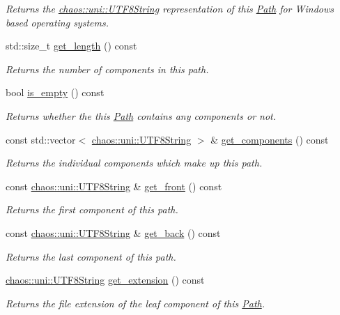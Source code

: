 \begin{DoxyCompactItemize}
\begin{DoxyCompactList}\small\item\em Returns the \hyperlink{classchaos_1_1uni_1_1_u_t_f8_string}{chaos\+::uni\+::\+U\+T\+F8\+String} representation of this \hyperlink{classchaos_1_1io_1_1sys_1_1_path}{Path} for Windows based operating systems. \end{DoxyCompactList}\item 
std\+::size\+\_\+t \hyperlink{classchaos_1_1io_1_1sys_1_1_path_aa3edecd81cd92a4fb16803bd9de9e7a4}{get\+\_\+length} () const 
\begin{DoxyCompactList}\small\item\em Returns the number of components in this path. \end{DoxyCompactList}\item 
bool \hyperlink{classchaos_1_1io_1_1sys_1_1_path_ad0eda5171d722eae64332dc143b6840b}{is\+\_\+empty} () const 
\begin{DoxyCompactList}\small\item\em Returns whether the this \hyperlink{classchaos_1_1io_1_1sys_1_1_path}{Path} contains any components or not. \end{DoxyCompactList}\item 
const std\+::vector$<$ \hyperlink{classchaos_1_1uni_1_1_u_t_f8_string}{chaos\+::uni\+::\+U\+T\+F8\+String} $>$ \& \hyperlink{classchaos_1_1io_1_1sys_1_1_path_ae20cae838af510b945e716d529e19bf4}{get\+\_\+components} () const 
\begin{DoxyCompactList}\small\item\em Returns the individual components which make up this path. \end{DoxyCompactList}\item 
const \hyperlink{classchaos_1_1uni_1_1_u_t_f8_string}{chaos\+::uni\+::\+U\+T\+F8\+String} \& \hyperlink{classchaos_1_1io_1_1sys_1_1_path_ab9dc2b0c35756b853f75b5eb664be046}{get\+\_\+front} () const 
\begin{DoxyCompactList}\small\item\em Returns the first component of this path. \end{DoxyCompactList}\item 
const \hyperlink{classchaos_1_1uni_1_1_u_t_f8_string}{chaos\+::uni\+::\+U\+T\+F8\+String} \& \hyperlink{classchaos_1_1io_1_1sys_1_1_path_abb776687ed013a911b239a0b49da1896}{get\+\_\+back} () const 
\begin{DoxyCompactList}\small\item\em Returns the last component of this path. \end{DoxyCompactList}\item 
\hyperlink{classchaos_1_1uni_1_1_u_t_f8_string}{chaos\+::uni\+::\+U\+T\+F8\+String} \hyperlink{classchaos_1_1io_1_1sys_1_1_path_ac7a2b7c374c1e4059b021b2c8751fb39}{get\+\_\+extension} () const 
\begin{DoxyCompactList}\small\item\em Returns the file extension of the leaf component of this \hyperlink{classchaos_1_1io_1_1sys_1_1_path}{Path}. \end{DoxyCompactList}\end{DoxyCompactItemize}


